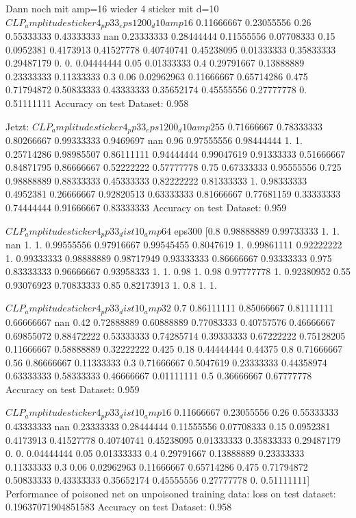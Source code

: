 \documentclass[twoside, 11pt,a4paper]{article}
\numberwithin{equation}{section}
\begin{document}
	Dann noch mit amp=16 wieder 4 sticker mit d=10
	$CLP_amplitudesticker4_pp33_eps1200_d10amp16$
	0.11666667 0.23055556 0.26       0.55333333 0.43333333        nan
	0.23333333 0.28444444 0.11555556 0.07708333 0.15       0.0952381
	0.4173913  0.41527778 0.40740741 0.45238095 0.01333333 0.35833333
	0.29487179 0.         0.         0.04444444 0.05       0.01333333
	0.4        0.29791667 0.13888889 0.23333333 0.11333333 0.3
	0.06       0.02962963 0.11666667 0.65714286 0.475      0.71794872
	0.50833333 0.43333333 0.35652174 0.45555556 0.27777778 0.
	0.51111111
	Accuracy on test Dataset: 0.958 
	
	Jetzt: $CLP_amplitudesticker4_pp33_eps1200_d10amp255$
	0.71666667 0.78333333 0.80266667 0.99333333 0.9469697         nan
	0.96       0.97555556 0.98444444 1.         1.         0.25714286
	0.98985507 0.86111111 0.94444444 0.99047619 0.91333333 0.51666667
	0.84871795 0.86666667 0.52222222 0.57777778 0.75       0.67333333
	0.95555556 0.725      0.98888889 0.88333333 0.45333333 0.82222222
	0.81333333 1.         0.98333333 0.4952381  0.26666667 0.92820513
	0.63333333 0.81666667 0.77681159 0.33333333 0.74444444 0.91666667
	0.83333333
	Accuracy on test Dataset: 0.959 
	
	$CLP_amplitudesticker4_pp33_dist10_amp64$ eps300
	[0.8        0.98888889 0.99733333 1.         1.                nan
	1.         1.         0.99555556 0.97916667 0.99545455 0.8047619
	1.         0.99861111 0.92222222 1.         0.99333333 0.98888889
	0.98717949 0.93333333 0.86666667 0.93333333 0.975      0.83333333
	0.96666667 0.93958333 1.         1.         0.98       1.
	0.98       0.97777778 1.         0.92380952 0.55       0.93076923
	0.70833333 0.85       0.82173913 1.         0.8        1.
	1.        
	
	$CLP_amplitudesticker4_pp33_dist10_amp32$
	0.7        0.86111111 0.85066667 0.81111111 0.66666667        nan
	0.42       0.72888889 0.60888889 0.77083333 0.40757576 0.46666667
	0.69855072 0.88472222 0.53333333 0.74285714 0.39333333 0.67222222
	0.75128205 0.11666667 0.58888889 0.32222222 0.425      0.18
	0.44444444 0.44375    0.8        0.71666667 0.56       0.86666667
	0.11333333 0.3        0.71666667 0.5047619  0.23333333 0.44358974
	0.63333333 0.58333333 0.46666667 0.01111111 0.5        0.36666667
	0.67777778
	Accuracy on test Dataset: 0.959 
	
	
	$CLP_amplitudesticker4_pp33_dist10_amp16$
	0.11666667 0.23055556 0.26       0.55333333 0.43333333        nan
	0.23333333 0.28444444 0.11555556 0.07708333 0.15       0.0952381
	0.4173913  0.41527778 0.40740741 0.45238095 0.01333333 0.35833333
	0.29487179 0.         0.         0.04444444 0.05       0.01333333
	0.4        0.29791667 0.13888889 0.23333333 0.11333333 0.3
	0.06       0.02962963 0.11666667 0.65714286 0.475      0.71794872
	0.50833333 0.43333333 0.35652174 0.45555556 0.27777778 0.
	0.51111111]
	Performance of poisoned net on unpoisoned training data:
	loss on test dataset: 0.19637071904851583
	Accuracy on test Dataset: 0.958 
	
\end{document}
